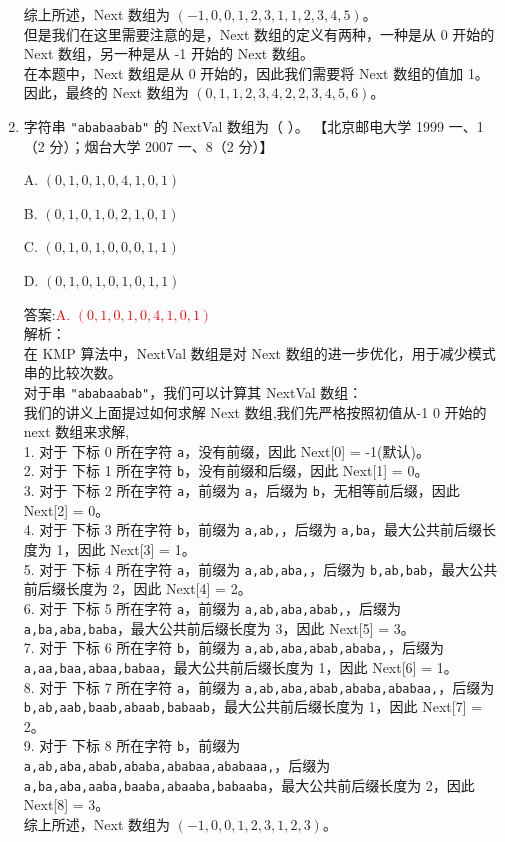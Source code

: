 \documentclass[lang=cn,newtx,10pt,scheme=chinese]{../../../elegantbook}
\begin{document}
\begin{enumerate}
    综上所述，Next 数组为 $(-1,0,0,1,2,3,1,1,2,3,4,5)$。\\
    但是我们在这里需要注意的是，Next 数组的定义有两种，一种是从 0 开始的 Next 数组，另一种是从 -1 开始的 Next 数组。\\
    在本题中，Next 数组是从 0 开始的，因此我们需要将 Next 数组的值加 1。\\
    因此，最终的 Next 数组为 $(0, 1, 1, 2, 3, 4, 2, 2, 3,4,5,6)$。\\
    \item 字符串 \texttt{"ababaabab"} 的 NextVal 数组为（ ）。  
    【北京邮电大学 1999 一、1（2 分）；烟台大学 2007 一、8（2 分）】  

    A. $(0, 1, 0, 1, 0, 4, 1, 0, 1)$  

    B. $(0, 1, 0, 1, 0, 2, 1, 0, 1)$  

    C. $(0, 1, 0, 1, 0, 0, 0, 1, 1)$  

    D. $(0, 1, 0, 1, 0, 1, 0, 1, 1)$  

    答案:\textcolor{red}{A. $(0, 1, 0, 1, 0, 4, 1, 0, 1)$}\\

    解析：\\
    在 KMP 算法中，NextVal 数组是对 Next 数组的进一步优化，用于减少模式串的比较次数。\\
    对于串 \texttt{"ababaabab"}，我们可以计算其 NextVal 数组：\\
    我们的讲义上面提过如何求解 Next 数组,我们先严格按照初值从-1 0 开始的next 数组来求解,\\
    1. 对于 下标 0 所在字符 \texttt{a}，没有前缀，因此 Next[0] = -1(默认)。\\
    2. 对于 下标 1 所在字符 \texttt{b}，没有前缀和后缀，因此 Next[1] = 0。\\
    3. 对于 下标 2 所在字符 \texttt{a}，前缀为 \texttt{a}，后缀为 \texttt{b}，无相等前后缀，因此 Next[2] = 0。\\
    4. 对于 下标 3 所在字符 \texttt{b}，前缀为 \texttt{a,ab,}，后缀为 \texttt{a,ba}，最大公共前后缀长度为 1，因此 Next[3] = 1。\\
    5. 对于 下标 4 所在字符 \texttt{a}，前缀为 \texttt{a,ab,aba,}，后缀为 \texttt{b,ab,bab}，最大公共前后缀长度为 2，因此 Next[4] = 2。\\
    6. 对于 下标 5 所在字符 \texttt{a}，前缀为 \texttt{a,ab,aba,abab,}，后缀为 \texttt{a,ba,aba,baba}，最大公共前后缀长度为 3，因此 Next[5] = 3。\\
    7. 对于 下标 6 所在字符 \texttt{b}，前缀为 \texttt{a,ab,aba,abab,ababa,}，后缀为 \texttt{a,aa,baa,abaa,babaa}，最大公共前后缀长度为 1，因此 Next[6] = 1。\\
    8. 对于 下标 7 所在字符 \texttt{a}，前缀为 \texttt{a,ab,aba,abab,ababa,ababaa,}，后缀为 \texttt{b,ab,aab,baab,abaab,babaab}，最大公共前后缀长度为 1，因此 Next[7] = 2。\\
    9. 对于 下标 8 所在字符 \texttt{b}，前缀为 \texttt{a,ab,aba,abab,ababa,ababaa,ababaaa,}，后缀为 \texttt{a,ba,aba,aaba,baaba,abaaba,babaaba}，最大公共前后缀长度为 2，因此 Next[8] = 3。\\
    综上所述，Next 数组为 $(-1,0,0,1,2,3,1,2,3)$。\\


\end{enumerate}
\end{document}
